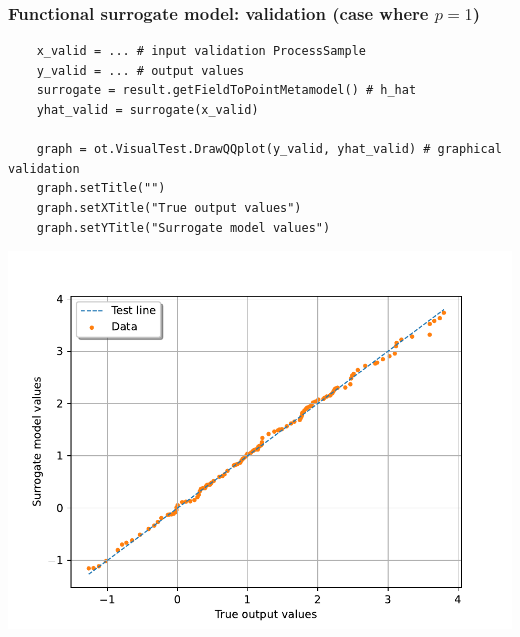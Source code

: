 \documentclass{beamer}
\begin{document}
  \begin{frame}[containsverbatim]
  \frametitle{Functional surrogate model: validation (case where $p=1$)}
  
  \small
  \begin{lstlisting}
    x_valid = ... # input validation ProcessSample
    y_valid = ... # output values
    surrogate = result.getFieldToPointMetamodel() # h_hat
    yhat_valid = surrogate(x_valid)

    graph = ot.VisualTest.DrawQQplot(y_valid, yhat_valid) # graphical validation
    graph.setTitle("")
    graph.setXTitle("True output values")
    graph.setYTitle("Surrogate model values")
  \end{lstlisting} 

  \centering
  \includegraphics[width=.5\textwidth]{figures/validation.pdf}

  \end{frame}
  
  
\end{document}
